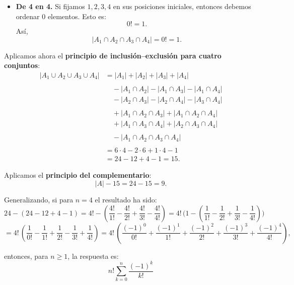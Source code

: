 \documentclass[a4paper,12pt]{article}
\begin{document}
    \begin{ejercicio}[title=Ejercicio 14]
    \begin{itemize}

    \item \textbf{De 4 en 4.}  
    Si fijamos $1,2,3,4$ en sus posiciones iniciales, entonces debemos ordenar $0$ elementos. Esto es:
    \[
    0! = 1.
    \]
    Así,
    \[
    |A_1 \cap A_2 \cap A_3 \cap A_4| = 0! = 1.
    \]
\end{itemize}

Aplicamos ahora el \textbf{principio de inclusión–exclusión para cuatro conjuntos}:
\[
\begin{aligned}
|A_1 \cup A_2 \cup A_3 \cup A_4|
&= |A_1| + |A_2| + |A_3| + |A_4|
\\\\
&\quad - |A_1\cap A_2| - |A_1\cap A_3| - |A_1\cap A_4|\\
&\quad - |A_2\cap A_3| - |A_2\cap A_4| - |A_3\cap A_4|
\\\\
&\quad + |A_1\cap A_2\cap A_3| + |A_1\cap A_2\cap A_4| \\
&\quad + |A_1\cap A_3\cap A_4| + |A_2\cap A_3\cap A_4|
\\\\
&\quad - |A_1\cap A_2\cap A_3\cap A_4|
\\\\
&= 6\cdot 4 - 2\cdot 6 + 1\cdot 4 - 1
\\[4pt]
&= 24 - 12 + 4 - 1 = 15.
\end{aligned}
\]

Aplicamos el \textbf{principio del complementario}:
\[
|A| - 15 = 24 - 15 = \boxed{9}.
\]

Generalizando, si para $n=4$ el resultado ha sido:
\[
24 - (24 - 12 + 4 - 1)
= 4! - \left(\frac{4!}{1!} - \frac{4!}{2!} + \frac{4!}{3!} - \frac{4!}{4!}\right)
= 4!\,\Biggl(1 - \left(\frac{1}{1!} - \frac{1}{2!} + \frac{1}{3!} - \frac{1}{4!}\right)\Biggr)
\]
\[
= 4!\,\left( \frac{1}{0!} - \frac{1}{1!} + \frac{1}{2!} - \frac{1}{3!} + \frac{1}{4!} \right)
= 4!\,\left( \frac{(-1)^0}{0!} + \frac{(-1)^1}{1!} + \frac{(-1)^2}{2!} + \frac{(-1)^3}{3!} + \frac{(-1)^4}{4!} \right),
\]

entonces, para $n\ge 1$, la respuesta es:
\[
\boxed{n!\sum_{k=0}^{n}\frac{(-1)^k}{k!}}
\]

\end{ejercicio}
\end{document}
